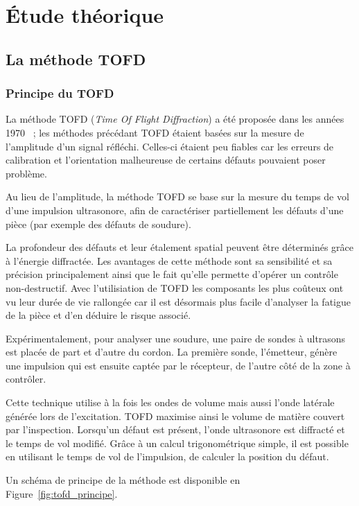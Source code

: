 \section{Étude théorique}
\subsection{La méthode TOFD}
\subsubsection{Principe du TOFD}

La méthode TOFD (\textit{Time Of Flight Diffraction}) a été proposée dans les années
1970~\autocite{bottcher_new_1973} ; les méthodes précédant TOFD étaient basées sur la
mesure de l'amplitude d'un signal réfléchi.
Celles-ci étaient peu fiables car les erreurs de calibration et l'orientation malheureuse de certains défauts pouvaient poser problème.

Au lieu de l'amplitude, la méthode TOFD se base sur la mesure du temps de vol d'une impulsion ultrasonore, afin de caractériser partiellement les défauts d'une pièce (par exemple des défauts de soudure).

La profondeur des défauts et leur étalement spatial peuvent être déterminés grâce à l'énergie diffractée.
Les avantages de cette méthode sont sa sensibilité et sa précision principalement ainsi que le fait qu'elle permette d'opérer un contrôle non-destructif. Avec l'utilisiation de TOFD les  composants les plus coûteux ont vu leur durée de vie rallongée car il est désormais plus facile d'analyser la fatigue de la pièce et d'en déduire le risque associé.

Expérimentalement, pour analyser une soudure, une paire de sondes à ultrasons est placée
de part et d'autre du cordon. La première sonde, l'émetteur, génère une impulsion qui est
ensuite captée par le récepteur, de l'autre côté de la zone à contrôler.

Cette technique utilise à la fois les ondes de volume mais aussi l'onde latérale générée lors de l'excitation. TOFD maximise ainsi le volume de matière couvert par l'inspection.
Lorsqu'un défaut est présent, l'onde ultrasonore est diffracté et le temps de vol modifié.
Grâce à un calcul trigonométrique simple, il est possible en utilisant le temps de vol de l'impulsion, de calculer la position du défaut.

Un schéma de principe de la méthode est disponible en Figure~\ref{fig:tofd_principe}.

